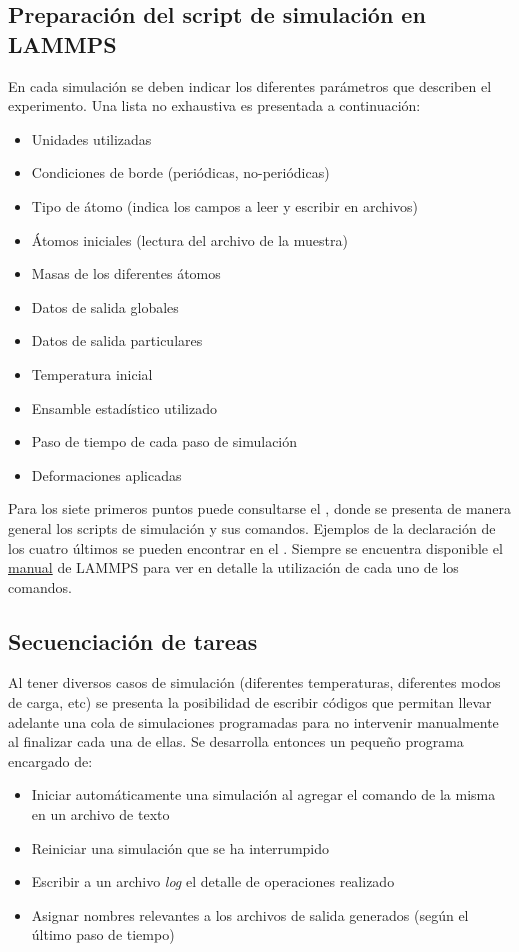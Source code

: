 \subsection{Preparación del script de simulación en LAMMPS}

En cada simulación se deben indicar los diferentes parámetros que describen el experimento. Una lista no exhaustiva es presentada a continuación:

\begin{itemize}
 \item Unidades utilizadas
 \item Condiciones de borde (periódicas, no-periódicas)
 \item Tipo de átomo (indica los campos a leer y escribir en archivos)
 \item Átomos iniciales (lectura del archivo de la muestra)
 \item Masas de los diferentes átomos
 \item Datos de salida globales
 \item Datos de salida particulares
 \item Temperatura inicial
 \item Ensamble estadístico utilizado
 \item Paso de tiempo de cada paso de simulación
 \item Deformaciones aplicadas
\end{itemize}

Para los siete primeros puntos puede consultarse el , donde se presenta de manera general los scripts de simulación y sus comandos. Ejemplos de la declaración de los cuatro últimos se pueden encontrar en el  . Siempre se encuentra disponible el \href{http://lammps.sandia.gov/doc/Manual.html}{manual} de LAMMPS para ver en detalle la utilización de cada uno de los comandos.

\subsection{Secuenciación de tareas}

Al tener diversos casos de simulación (diferentes temperaturas, diferentes modos de carga, etc) se presenta la posibilidad de escribir códigos que permitan llevar adelante una cola de simulaciones programadas para no intervenir manualmente al finalizar cada una de ellas. Se desarrolla entonces un pequeño programa encargado de:

\begin{itemize}
 \item Iniciar automáticamente una simulación al agregar el comando de la misma en un archivo de texto
 \item Reiniciar una simulación que se ha interrumpido
 \item Escribir a un archivo \textit{log} el detalle de operaciones realizado
 \item Asignar nombres relevantes a los archivos de salida generados (según el último paso de tiempo)
\end{itemize}

